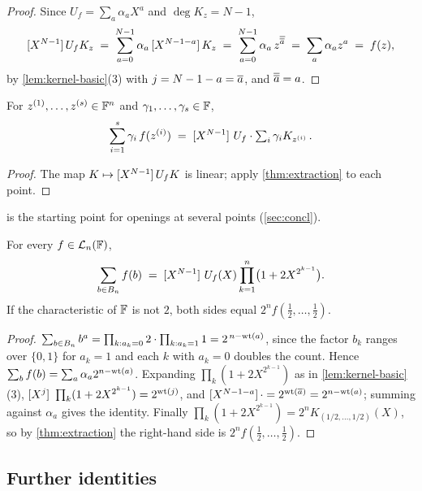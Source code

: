 \begin{proof}
Since $U_f = \sum_a \alpha_a X^a$ and $\deg K_z = N-1$,
\[
  [X^{N-1}]\,U_f K_z \;=\; \sum_{a=0}^{N-1} \alpha_a\, [X^{N-1-a}]\,K_z \;=\; \sum_{a=0}^{N-1} \alpha_a\, z^{\overline{\overline{a}}} \;=\; \sum_{a} \alpha_a z^a \;=\; f(z),
\]
by \cref{lem:kernel-basic}(3) with $j = N-1-a = \overline{a}$, and $\overline{\overline{a}} = a$.
\end{proof}

\begin{corollary}\label{cor:several-points}
For $z^{(1)}, \dots, z^{(s)} \in \mathbb{F}^n$ and $\gamma_1, \dots, \gamma_s \in \mathbb{F}$,
\[
  \sum_{i=1}^{s} \gamma_i\, f(z^{(i)}) \;=\; [X^{N-1}]\,\,U_f \cdot \textstyle\sum_{i} \gamma_i K_{z^{(i)}}\,.
\]
\end{corollary}

\begin{proof}
The map $K \mapsto [X^{N-1}]\,U_f K$ is linear; apply \cref{thm:extraction} to each point.
\end{proof}

 is the starting point for openings at several points (\cref{sec:concl}).

\begin{corollary}\label{cor:cube-sum}
For every $f \in \mathcal{L}_n(\mathbb{F})$,
\[
  \sum_{b \in B_n} f(b) \;=\; [X^{N-1}]\,\,U_f(X) \prod_{k=1}^{n} \bigl(1 + 2X^{2^{k-1}}\bigr).
\]
If the characteristic of $\mathbb{F}$ is not $2$, both sides equal $2^n f(\tfrac12, \dots, \tfrac12)$.
\end{corollary}

\begin{proof}
$\sum_{b \in B_n} b^a = \prod_{k : a_k = 0} 2 \cdot \prod_{k : a_k = 1} 1 = 2^{\,n - \mathrm{wt}(a)}$, since the factor $b_k$ ranges over $\{0,1\}$ for $a_k = 1$ and each $k$ with $a_k = 0$ doubles the count. Hence $\sum_b f(b) = \sum_a \alpha_a 2^{n - \mathrm{wt}(a)}$.
Expanding $\prod_k (1 + 2X^{2^{k-1}})$ as in \cref{lem:kernel-basic}(3), $[X^{j}]\,\,\prod_k (1 + 2X^{2^{k-1}}) = 2^{\mathrm{wt}(j)}$, and $[X^{N-1-a}]\,\cdot = 2^{\mathrm{wt}(\overline{a})} = 2^{n - \mathrm{wt}(a)}$; summing against $\alpha_a$ gives the identity.
Finally $\prod_k (1 + 2X^{2^{k-1}}) = 2^n K_{(1/2,\dots,1/2)}(X)$, so by \cref{thm:extraction} the right-hand side is $2^n f(\tfrac12,\dots,\tfrac12)$.
\end{proof}

\subsection{Further identities}\label{sec:kernel:further}

